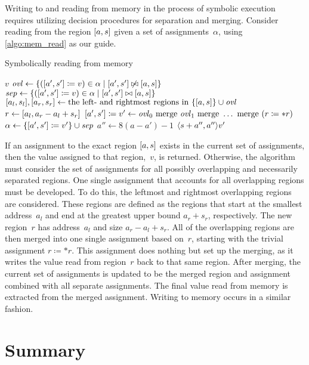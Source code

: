 Writing to and reading from memory in the process of symbolic execution
requires utilizing decision procedures for separation and merging.
Consider reading from the region $[a,s]$ given a set of assignments~$\alpha$,
using \cref{algo:mem_read} as our guide.
\begin{algorithm}
  \caption{Symbolically reading from memory}\label{algo:mem_read}
  \begin{algorithmic}
        \State\Return $v$
      \Else
        \State $\mathit{ovl}\gets\{([a',s']\coloneqq v)\in
        \alpha\mid[a',s']\not\bowtie[a,s]\}$
        \State $\mathit{sep}\gets\{([a',s']\coloneqq v)\in
        \alpha\mid[a',s']\bowtie[a,s]\}$
        \State $[a_l,s_l],[a_r,s_r]\gets
        \text{the left- and rightmost regions in }\{[a,s]\}\cup\mathit{ovl}$
        \State $r\gets[a_l,a_r-a_l+s_r]$
        \State $[a',s']\coloneqq v'\gets
        \mathit{ovl}_0\text{ merge }\mathit{ovl}_1\text{ merge }\ldots\text{ merge }(r\coloneqq *r)$
        \State $\alpha\gets\{[a',s']\coloneqq v'\}\cup\mathit{sep}$
        \State $a''\gets8(a-a')-1$
        \State\Return $\langle s+a'',a''\rangle v'$
      \EndIf
    \EndFunction
  \end{algorithmic}
\end{algorithm}
If an assignment to the exact region $[a,s]$
exists in the current set of assignments,
then the value assigned to that region,~$v$, is returned.
Otherwise, the algorithm must consider the set of assignments
for all possibly overlapping and necessarily separated regions.
One single assignment that accounts for all overlapping regions must be developed.
To do this, the leftmost and rightmost overlapping regions are considered.
These regions are defined as the regions that start at the smallest address~$a_l$
and end at the greatest upper bound $a_r+s_r$, respectively.
The new region~$r$ has address~$a_l$ and size $a_r-a_l+s_r$.
All of the overlapping regions are then merged into one single assignment based on~$r$,
starting with the trivial assignment $r\coloneqq *r$.
This assignment does nothing but set up the merging,
as it writes the value read from region~$r$ back to that same region.
After merging, the current set of assignments is updated to be the merged region
and assignment combined with all separate assignments.
The final value read from memory is extracted from the merged assignment.
Writing to memory occurs in a similar fashion.

\section{Summary}
